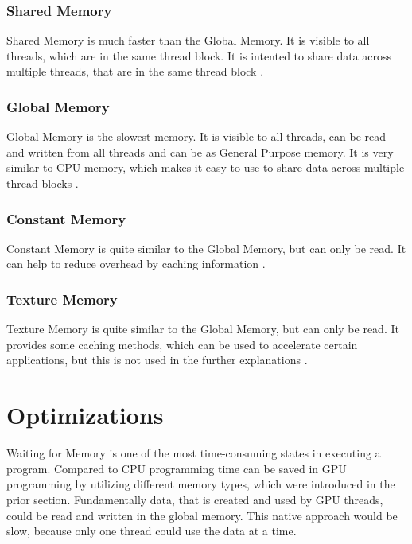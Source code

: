 \documentclass[conference]{IEEEtran}
\begin{document}
		\subsubsection{Shared Memory}
			Shared Memory is much faster than the Global Memory. It is visible to all threads, which are in the same thread block. It is intented to share data across multiple threads, that are in the same thread block  \cite{nvidia_developer_documentation} \cite{ueng2008cuda}.
		\subsubsection{Global Memory}
			Global Memory is the slowest memory. It is visible to all threads, can be read and written from all threads and can be as General Purpose memory. It is very similar to CPU memory, which makes it easy to use to share data across multiple thread blocks \cite{ueng2008cuda}.
		\subsubsection{Constant Memory}
			Constant Memory is quite similar to the Global Memory, but can only be read. It can help to reduce overhead by caching information \cite{ueng2008cuda} \cite{bakkum2010accelerating}.
		\subsubsection{Texture Memory}
			Texture Memory is quite similar to the Global Memory, but can only be read. It provides some caching methods, which can be used to accelerate certain applications, but this is not used in the further explanations \cite{nvidia_developer_documentation}.
		
		
		
		


\section{Optimizations}

	Waiting for Memory is one of the most time-consuming states in executing a program. Compared to CPU programming time can be saved in GPU programming by utilizing different memory types, which were introduced in the prior section. Fundamentally data, that is created and used by GPU threads, could be read and written in the global memory. This native approach would be slow, because only one thread could use the data at a time.
	
\end{document}
